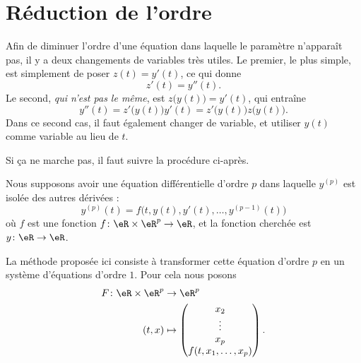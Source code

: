 \section{Réduction de l'ordre}
\label{SecWGdleRM}

Afin de diminuer l'ordre d'une équation dans laquelle le paramètre n'apparaît pas, il y a deux changements de variables très utiles. Le premier, le plus simple, est simplement de poser \( z(t)=y'(t)\), ce qui donne
\begin{equation}
	z'(t)=y''(t).
\end{equation}
Le second, \emph{qui n'est pas le même}, est \( z\big( y(t) \big)=y'(t)\), qui entraîne
\begin{equation}
	y''(t)=z'\big( y(t) \big)y'(t)=z'\big( y(t) \big)z\big( y(t) \big).
\end{equation}
Dans ce second cas, il faut également changer de variable, et utiliser \( y(t)\) comme variable au lieu de \( t\).


Si ça ne marche pas, il faut suivre la procédure ci-après.

Nous supposons avoir une équation différentielle d'ordre \( p\) dans laquelle \( y^{(p)}\) est isolée des autres dérivées :
\begin{equation}    \label{EqHDeVQgn}
	y^{(p)}(t)=f\big( t,y(t),y'(t),\ldots, y^{(p-1)}(t) \big)
\end{equation}
où \( f\) est une fonction \( f\colon \eR\times \eR^p\to \eR\), et la fonction cherchée est \( y\colon \eR\to \eR\).

La méthode proposée ici consiste à transformer cette équation d'ordre \( p\) en un système d'équations d'ordre \( 1\). Pour cela nous posons
\begin{equation}
	\begin{aligned}
		F\colon \eR\times \eR^p & \to \eR^p                   \\
		(t,x)                   & \mapsto \begin{pmatrix}
			                                  x_2    \\
			                                  \vdots \\
			                                  x_p    \\
			                                  f(t,x_1,\ldots, x_p)
		                                  \end{pmatrix}.
	\end{aligned}
\end{equation}

